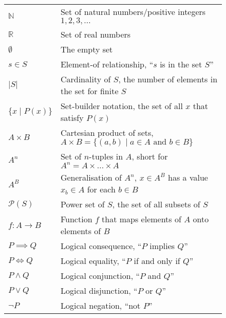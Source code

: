 \begin{figure}[h]
    \centering
    \begin{tabular}{ll}
        $\mathbb N$        & Set of natural numbers/positive integers $1,2,3,\dots$\\
        $\mathbb R$        & Set of real numbers\\
        $\emptyset$        & The empty set\\[1em]
        $s\in S$           & Element-of relationship, ``$s$ is in the set $S$''\\
        $|S|$              & Cardinality of $S$, the number of elements in the set for finite $S$\\
        $\{x\mid P(x)\}$   & Set-builder notation, the set of all $x$ that satisfy $P(x)$\\
        $A\times B$        & Cartesian product of sets, $A\times B=\{(a,b)\mid a\in A\text{ and }b\in B\}$\\
        $A^n$              & Set of $n$-tuples in $A$, short for $A^n=A\times\dots\times A$\\
        $A^B$              & Generalisation of $A^n$, $x\in A^B$ has a value $x_b\in A$ for each $b\in B$\\
        $\mathcal P(S)$    & Power set of $S$, the set of all subsets of $S$\\
        $f:A\rightarrow B$ & Function $f$ that maps elements of $A$ onto elements of $B$\\[1em]
        $P\implies Q$      & Logical consequence, ``$P$ implies $Q$''\\
        $P\iff Q$          & Logical equality, ``$P$ if and only if $Q$''\\
        $P\mathrel\land Q$ & Logical conjunction, ``$P$ and $Q$''\\
        $P\mathrel\lor Q$  & Logical disjunction, ``$P$ or $Q$''\\
        $\neg P$           & Logical negation, ``not $P$''
    \end{tabular}
\end{figure}